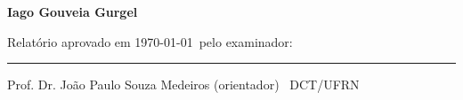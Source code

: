 
%
%
%
%

\begin{titlepage}

\begin{center}

\LARGE

\textbf{\titulo}

\vfill

\Large

\textbf{Iago Gouveia Gurgel}

\end{center}

\vfill

\noindent

Relatório aprovado em \today\ pelo examinador:

\begin{center}

\vspace{1.5cm}\rule{0.95\linewidth}{1pt}
\parbox{0.9\linewidth}{%
Prof. Dr. João Paulo Souza Medeiros (orientador) \dotfill\ DCT/UFRN}

\end{center}

\end{titlepage}
